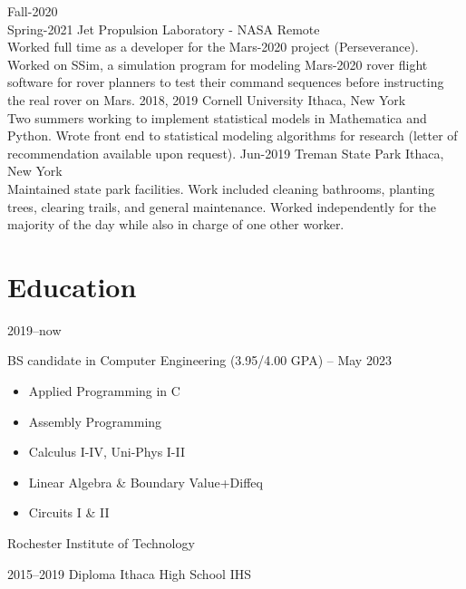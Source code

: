 \documentclass[print]{cv-style}          %
\begin{document}
\begin{entrylist}
\entry
  {Fall-2020\\Spring-2021}
  {Jet Propulsion Laboratory - NASA}
  {Remote}
  {\\
  Worked full time as a developer for the Mars-2020 project (Perseverance). Worked on SSim, a simulation program for modeling Mars-2020 rover flight software for rover planners to test their command sequences before instructing the real rover on Mars.}
\entry
  {2018, 2019}
  {Cornell University}
  {Ithaca, New York}
  {\\
  Two summers working to implement statistical models in Mathematica and Python. Wrote front end to statistical modeling algorithms for research (letter of recommendation available upon request).}
  \entry
  {Jun-2019}
  {Treman State Park}
  {Ithaca, New York}
  {\\
Maintained state park facilities. Work included cleaning bathrooms, planting trees, clearing trails, and general maintenance. Worked independently for the majority of the day while also in charge of one other worker.}


\end{entrylist}


\section{Education}

\begin{entrylist}
{\vspace{-0.3cm}}
\entry
{2019--now}
{BS candidate {\normalfont in Computer Engineering (3.95/4.00 GPA) -- May 2023} \\
\begin{itemize}%
	\item Applied Programming in C
	\item Assembly Programming
	\item Calculus I-IV, Uni-Phys I-II
	\item Linear Algebra \& Boundary Value+Diffeq
	\item Circuits I \& II
\end{itemize}
}
{Rochester Institute of Technology}
{\vspace{-0.3cm}}

\entry
{2015--2019}
{Diploma {\normalfont Ithaca High School}}
{IHS}
{\vspace{-8cm}}
{}

\end{entrylist}
\end{document}
